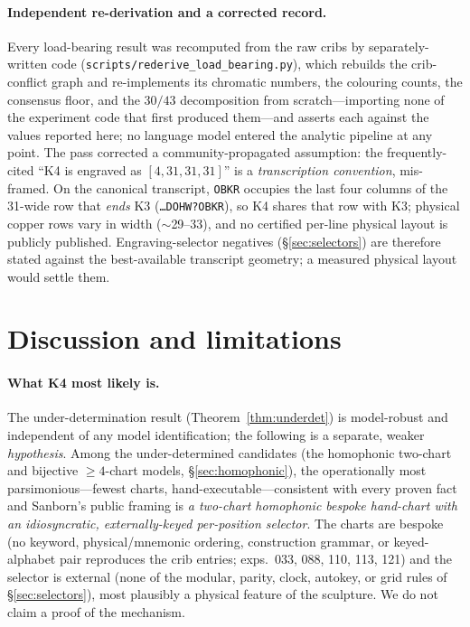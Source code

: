 \documentclass[11pt]{article}
\theoremstyle{plain}
\theoremstyle{definition}
\newcommand{\K}{\textsf{K4}}
\begin{document}
\paragraph{Independent re-derivation and a corrected record.} Every load-bearing
result was recomputed from the raw cribs by separately-written code
(\texttt{scripts/rederive\_load\_bearing.py}), which rebuilds the crib-conflict graph
and re-implements its chromatic numbers, the colouring counts, the consensus floor,
and the $30/43$ decomposition from scratch---importing none of the experiment code
that first produced them---and asserts each against the values reported here; no
language model entered the analytic pipeline at any point. The pass corrected a community-propagated assumption: the
frequently-cited ``\K{} is engraved as $[4,31,31,31]$'' is a \emph{transcription
convention}, mis-framed. On the canonical transcript, \texttt{OBKR} occupies the last four
columns of the 31-wide row that \emph{ends} K3 (\texttt{\dots DOHW?OBKR}), so \K{}
shares that row with K3; physical copper rows vary in width ($\sim$29--33), and no certified
per-line physical layout is publicly published. Engraving-selector negatives
(\S\ref{sec:selectors}) are therefore stated against the best-available transcript
geometry; a measured physical layout would settle them.

\section{Discussion and limitations}\label{sec:disc}

\paragraph{What K4 most likely is.} The under-determination result
(Theorem~\ref{thm:underdet}) is model-robust and independent of any model
identification; the following is a separate, weaker \emph{hypothesis}. Among the
under-determined candidates (the homophonic two-chart and bijective $\ge4$-chart
models, \S\ref{sec:homophonic}), the operationally most parsimonious---fewest charts,
hand-executable---consistent with every proven fact and Sanborn's public framing is
\emph{a two-chart homophonic bespoke hand-chart with an idiosyncratic,
externally-keyed per-position selector}. The charts are bespoke (no keyword,
physical/mnemonic ordering, construction grammar, or keyed-alphabet pair reproduces
the crib entries; exps.~033, 088, 110, 113, 121) and the selector is external (none of
the modular, parity, clock, autokey, or grid rules of \S\ref{sec:selectors}), most
plausibly a physical feature of the sculpture. We do not claim a proof of the
mechanism.
\end{document}
